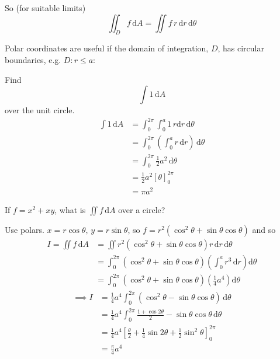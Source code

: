 \documentclass[10pt]{scrartcl}
\begin{document}
So (for suitable limits)
\[
  \iint_D f\,\mathrm{d}A = \iint f\,r\,\mathrm{d}r\,\mathrm{d}\theta
\]

Polar coordinates are useful if the domain of integration, $D$, has circular boundaries, e.g. $D: r \leq a$: 
\begin{center}
\end{center}

\begin{example}
Find \[\int 1\,\mathrm{d}A\] over the unit circle. 
\begin{align*}
  \int 1\,\mathrm{d}A &= \int_0^{2\pi}\int_0^a 1\,r\mathrm{d}r\,\mathrm{d}\theta\\
  &= \int_0^{2\pi} \left(\int_0^a r\,\mathrm{d}r\right)\,\mathrm{d}\theta\\
  &= \int_0^{2\pi} \frac{1}{2}a^2 \,\mathrm{d}\theta \\
  &= \frac{1}{2}a^2\left[\theta\right]_0^{2\pi}\\
  &= \pi a^2
\end{align*}
\end{example}\vsp

\begin{example}
If $f = x^2 + xy$, what is $\iint f\,\mathrm{d}A$ over a circle? 

Use polars. $x = r\cos\theta,\, y = r\sin\theta$, so $f = r^2(\cos^2\theta + \sin\theta\cos\theta)$ and so 
\begin{align*}
  I = \iint f\,\mathrm{d}A &= \iint r^2(\cos^2\theta + \sin\theta\cos\theta)r\,\mathrm{d}r\,\mathrm{d}\theta\\
  &= \int_0^{2\pi}(\cos^2\theta + \sin\theta\cos\theta)\left(\int_0^a r^3\,\mathrm{d}r\right)\mathrm{d}\theta\\
    &= \int_0^{2\pi} (\cos^2\theta + \sin\theta\cos\theta) \left(\frac{1}{4}a^4\right)\mathrm{d}\theta
\end{align*}
\begin{align*}
 \implies I &= \frac{1}{4}a^4\int_0^{2\pi}(\cos^2\theta - \sin\theta\cos\theta)\,\mathrm{d}\theta\\
  &= \frac{1}{4}a^4\int_0^{2\pi} \frac{1 + \cos2\theta}{2} - \sin\theta\cos\theta\,\mathrm{d}{\theta}\\
  &= \frac{1}{4}a^4\left[\frac{\theta}{2} + \frac{1}{4}\sin2\theta + \frac{1}{2}\sin^2\theta\right]_0^{2\pi}\\
  &= \frac{\pi}{4}a^4
\end{align*}
\end{example}
\end{document}
